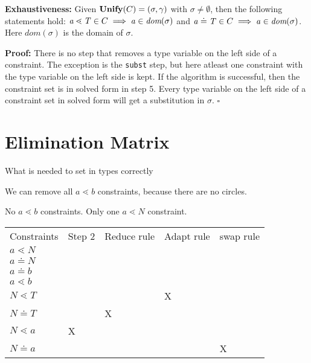 \begin{lemma}\label{lemma:unify-exhaustive}
  \textbf{Exhaustiveness:}
  Given $\textbf{Unify}{}(C) = (\sigma, \gamma{})$ with $\sigma \neq \emptyset$,
  then the following statements hold:
  $\mathit{ a } \lessdot \mathit{T} \in C \implies \mathit{ a } \in \textit{dom}(\sigma)$ and
  $\mathit{ a } \doteq \mathit{T} \in C \implies \mathit{ a } \in \textit{dom}(\sigma)$.
  Here $\textit{dom}(\sigma)$ is the domain of $\sigma$.
\end{lemma} %
\textbf{Proof:}
There is no step that removes a type variable on the left side of a constraint.
The exception is the \texttt{subst} step,
but here atleast one constraint with the type variable on the left side is kept.
If the \unify{} algorithm is successful, then the constraint set is in solved form in step 5.
Every type variable on the left side of a constraint set in solved form will get a substitution in $\sigma$.
\hfill $\square$

\begin{theorem}
  \label{theo:unifyTypeSolution}
\end{theorem}

\section{Elimination Matrix}
What is needed to set in types correctly

We can remove all $a \lessdot b$ constraints, because there are no circles.

No $a \lessdot b$ constraints.
Only one $a \lessdot N$ constraint.


\begin{table}[]
  \begin{tabular}{lllll}
  Constraints    & Step 2 & Reduce rule & Adapt rule & swap rule \\
  $a \lessdot N$ &        &             &            &           \\
  $a \doteq N$   &        &             &            &           \\
  $a \doteq b$   &        &             &            &           \\
  $a \lessdot b$ &        &             &            &           \\
  $N \lessdot T$ &        &             & X          &           \\
  $N \doteq T$   &        & X           &            &           \\
  $N \lessdot a$ & X      &             &            &           \\
  $N \doteq a$   &        &             &            & X        
  \end{tabular}
  \end{table}